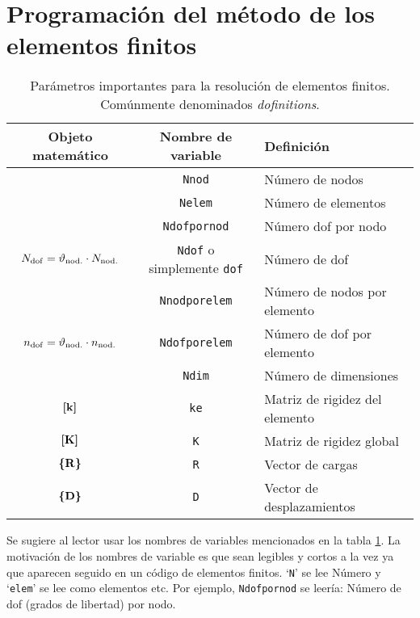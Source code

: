 
\part{Programación del método de los elementos finitos}

\begin{table}[htb!]
	\centering
	\begin{tabular}{ccl}
		Objeto matemático & Nombre de variable & Definición \\ \hline
		\Nnod	& \texttt{Nnod}                   &    Número de nodos        \\
		\Nelem	& \texttt{Nelem}                   &    Número de elementos       \\
		\Ndofpornod	& \texttt{Ndofpornod}                   &    Número dof por nodo       \\
		$N_{\mathrm{dof}}=\vartheta_{\mathrm{nod.}} \cdot N_{\mathrm{nod.}}$	& \texttt{Ndof} {\footnotesize{}o simplemente} \texttt{dof}                   &    Número de dof        \\
		\Nnodporelem	& \texttt{Nnodporelem}                   &    Número de nodos por elemento     \\
		$n_{\mathrm{dof}}= \vartheta_{\mathrm{nod.}} \cdot n_{\mathrm{nod.}}$	& \texttt{Ndofporelem}                   &    Número de dof por elemento       \\
		\Ndims	& \texttt{Ndim}                   &    Número de dimensiones      \\
		$\boldsymbol{[}\mathbf{k} \boldsymbol{]}$	& \texttt{ke}                   &   Matriz de rigidez del elemento      \\
		$\boldsymbol{[}\mathbf{K} \boldsymbol{]}$	& \texttt{K}                   &   Matriz de rigidez global      \\
		$\boldsymbol{\{ }\mathbf{R} \boldsymbol{\}}$   & \texttt{R}                  &  Vector de cargas \\
		$\boldsymbol{\{ }\mathbf{D} \boldsymbol{\}}$   & \texttt{D}                 & Vector de desplazamientos \\
	\end{tabular}
	
	\caption{Parámetros importantes para la resolución de elementos finitos. Comúnmente denominados \textit{dofinitions}.}
	\label{tab:VariableDefinitions}
\end{table}

Se sugiere al lector usar los nombres de variables mencionados en la tabla \ref{tab:VariableDefinitions}. La motivación de los nombres de variable es que sean legibles y cortos a la vez ya que aparecen seguido en un código de elementos finitos. `\texttt{N}' se lee Número y `\texttt{elem}' se lee como elementos etc. Por ejemplo, \texttt{Ndofpornod} se leería: Número de dof (grados de libertad) por nodo.

